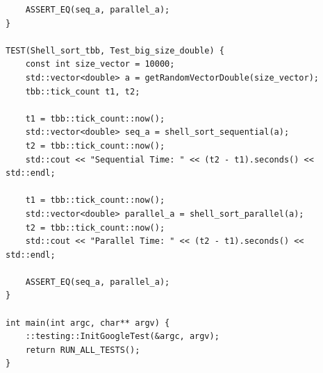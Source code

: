 \documentclass{report}
\begin{document}
\begin{lstlisting}
    ASSERT_EQ(seq_a, parallel_a);
}

TEST(Shell_sort_tbb, Test_big_size_double) {
    const int size_vector = 10000;
    std::vector<double> a = getRandomVectorDouble(size_vector);
    tbb::tick_count t1, t2;

    t1 = tbb::tick_count::now();
    std::vector<double> seq_a = shell_sort_sequential(a);
    t2 = tbb::tick_count::now();
    std::cout << "Sequential Time: " << (t2 - t1).seconds() << std::endl;

    t1 = tbb::tick_count::now();
    std::vector<double> parallel_a = shell_sort_parallel(a);
    t2 = tbb::tick_count::now();
    std::cout << "Parallel Time: " << (t2 - t1).seconds() << std::endl;

    ASSERT_EQ(seq_a, parallel_a);
}

int main(int argc, char** argv) {
    ::testing::InitGoogleTest(&argc, argv);
    return RUN_ALL_TESTS();
}
\end{lstlisting}
\end{document}
